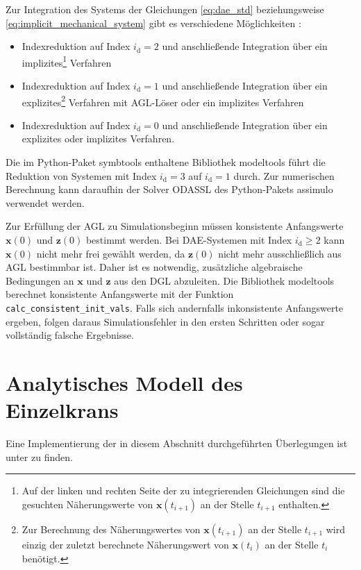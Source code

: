 Zur Integration des Systems der Gleichungen \eqref{eq:dae_std} beziehungsweise \eqref{eq:implicit_mechanical_system} gibt es verschiedene Möglichkeiten \cite[Kap. 8]{ModSimSkript}: 
\begin{itemize}
\item  Indexreduktion auf Index $i_\mathrm{d} = 2$ und anschließende Integration über ein implizites\footnote{Auf der linken und rechten Seite der zu integrierenden Gleichungen sind die gesuchten Näherungswerte von $\mathbf{x}(t_{i+1})$ an der Stelle $t_{i+1}$ enthalten.} Verfahren
\item Indexreduktion auf Index $i_\mathrm{d} = 1$ und anschließende Integration über ein explizites\footnote{Zur Berechnung des Näherungswertes von $\mathbf{x}(t_{i+1})$ an der Stelle $t_{i+1}$ wird einzig der zuletzt berechnete Näherungswert von $\mathbf{x}(t_{i})$ an der Stelle $t_{i}$ benötigt.} Verfahren mit AGL-Löser oder ein implizites Verfahren
\item Indexreduktion auf Index  $i_\mathrm{d} = 0$ und anschließende Integration über ein explizites oder implizites Verfahren.
\end{itemize}
Die im Python-Paket symbtools \cite{symbtools} enthaltene Bibliothek modeltools führt die Reduktion von Systemen mit Index $i_\mathrm{d} = 3$ auf $i_\mathrm{d} = 1$ durch. Zur numerischen Berechnung kann daraufhin der Solver ODASSL des Python-Pakets assimulo \cite{assimulo} verwendet werden.

Zur Erfüllung der AGL zu Simulationsbeginn müssen konsistente Anfangswerte $\mathbf{x}(0)$ und $\mathbf{z}(0)$ bestimmt werden. Bei DAE-Systemen mit Index $i_\mathrm{d} \geq 2$  kann $\mathbf{x}(0)$ nicht mehr frei gewählt werden, da $\mathbf{z}(0)$ nicht mehr ausschließlich aus AGL bestimmbar ist. Daher ist es notwendig, zusätzliche algebraische Bedingungen an $\mathbf{x}$ und $\mathbf{z}$ aus den DGL abzuleiten. Die Bibliothek modeltools berechnet konsistente Anfangswerte mit der Funktion \texttt{calc\_consistent\_init\_vals}. Falls sich andernfalls inkonsistente Anfangswerte ergeben, folgen daraus Simulationsfehler in den ersten Schritten oder sogar vollständig falsche Ergebnisse. \cite[S.207]{JanschekSystementwurf}

\section{Analytisches Modell des Einzelkrans}
\label{sec:single_crane}
Eine Implementierung der in diesem Abschnitt durchgeführten Überlegungen ist unter \cite[flatness\_notebooks/ODE\_flatness\_analysis\_single\_crane.ipynb]{SAGithub} zu finden.

